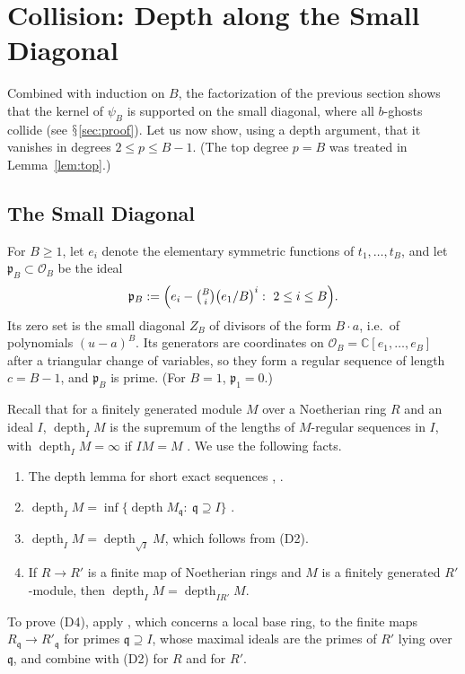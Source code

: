 \documentclass[11pt]{amsart}
\numberwithin{equation}{section}
\renewcommand{\S}{\mbox{$\mathsection$}}
\theoremstyle{definition}
\theoremstyle{remark}
\newcommand{\C}{\mathbb{C}}
\newcommand{\pp}{\mathfrak{p}}
\newcommand{\cO}{\mathcal{O}}
\newcommand{\depth}{\operatorname{depth}}
\begin{document}
\section{Collision: Depth along the Small Diagonal}\label{sec:collision}

Combined with induction on $B$, the factorization of the previous section shows that the kernel of $\psi_B$ is supported on the small diagonal, where all $b$-ghosts collide (see \S\ref{sec:proof}). Let us now show, using a depth argument, that it vanishes in degrees $2\le p\le B-1$. (The top degree $p=B$ was treated in Lemma~\ref{lem:top}.)

\subsection{The Small Diagonal}
For $B\ge1$, let $e_i$ denote the elementary symmetric functions of $t_1,\dots,t_B$, and let $\pp_B\subset\cO_B$ be the ideal
\begin{equation}\label{eq:collision}
\pp_B:=\Bigl(e_i-\tbinom Bi\bigl(e_1/B\bigr)^i:\ 2\le i\le B\Bigr).
\end{equation}
Its zero set is the small diagonal $Z_B$ of divisors of the form $B\cdot a$, i.e.\ of polynomials $(u-a)^B$. Its generators are coordinates on $\cO_B=\C[e_1,\dots,e_B]$ after a triangular change of variables, so they form a regular sequence of length $c=B-1$, and $\pp_B$ is prime. (For $B=1$, $\pp_1=0$.)

Recall that for a finitely generated module $M$ over a Noetherian ring $R$ and an ideal $I$, $\depth_IM$ is the supremum of the lengths of $M$-regular sequences in $I$, with $\depth_IM=\infty$ if $IM=M$ \cite[Definition~10.72.1, Tag~00LI]{Stacks}. We use the following facts.
\begin{enumerate}[label=(D\arabic*),leftmargin=3em]
\item The depth lemma for short exact sequences \cite[Section~47.11]{Stacks}, \cite[\S1.2]{BH93}.
\item $\depth_IM=\inf\{\depth M_{\mathfrak q}:\ \mathfrak q\supseteq I\}$ \cite[\S1.2]{BH93}.
\item $\depth_IM=\depth_{\sqrt I}M$, which follows from (D2).
\item If $R\to R'$ is a finite map of Noetherian rings and $M$ is a finitely generated $R'$-module, then $\depth_IM=\depth_{IR'}M$.
\end{enumerate}
To prove (D4), apply \cite[Lemma~10.72.11, Tag~0AUK]{Stacks}, which concerns a local base ring, to the finite maps $R_{\mathfrak q}\to R'_{\mathfrak q}$ for primes $\mathfrak q\supseteq I$, whose maximal ideals are the primes of $R'$ lying over $\mathfrak q$, and combine with (D2) for $R$ and for $R'$.
\end{document}
